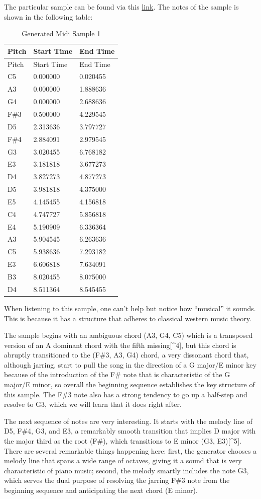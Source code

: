 \documentclass[12pt,oneside]{chicagocapstone}
\begin{document}
The particular sample can be found via this \href{https://github.com/terrywang15/museG_dev/blob/master/2020-01-31\%2002-20/ep_400.mid}{link}. The notes of the sample is shown in the following table:
\begin{longtable}[]{@{}lll@{}}
\caption{\label{tab:inher} Generated Midi Sample 1}\tabularnewline
\toprule
Pitch & Start Time & End Time\tabularnewline
\midrule
\endfirsthead
\toprule
Pitch & Start Time & End Time\tabularnewline
\midrule
\endhead
C5 & 0.000000 & 0.020455\tabularnewline
A3 & 0.000000 & 1.888636\tabularnewline
G4 & 0.000000 & 2.688636\tabularnewline
F\#3 & 0.500000 & 4.229545\tabularnewline
D5 & 2.313636 & 3.797727\tabularnewline
F\#4 & 2.884091 & 2.979545\tabularnewline
G3 & 3.020455 & 6.768182\tabularnewline
E3 & 3.181818 & 3.677273\tabularnewline
D4 & 3.827273 & 4.877273\tabularnewline
D5 & 3.981818 & 4.375000\tabularnewline
E5 & 4.145455 & 4.156818\tabularnewline
C4 & 4.747727 & 5.856818\tabularnewline
E4 & 5.190909 & 6.336364\tabularnewline
A3 & 5.904545 & 6.263636\tabularnewline
C5 & 5.938636 & 7.293182\tabularnewline
E3 & 6.606818 & 7.634091\tabularnewline
B3 & 8.020455 & 8.075000\tabularnewline
D4 & 8.511364 & 8.545455\tabularnewline
\bottomrule
\end{longtable}
When listening to this sample, one can't help but notice how ``musical'' it sounds. This is because it has a structure that adheres to classical western music theory.

The sample begins with an ambiguous chord (A3, G4, C5) which is a transposed version of an A dominant chord with the fifth missing{[}\^{}4{]}, but this chord is abruptly transitioned to the (F\#3, A3, G4) chord, a very dissonant chord that, although jarring, start to pull the song in the direction of a G major/E minor key because of the introduction of the F\# note that is characteristic of the G major/E minor, so overall the beginning sequence establishes the key structure of this sample. The F\#3 note also has a strong tendency to go up a half-step and resolve to G3, which we will learn that it does right after.

The next sequence of notes are very interesting. It starts with the melody line of D5, F\#4, G3, and E3, a remarkably smooth transition that implies D major with the major third as the root (F\#), which transitions to E minor (G3, E3){[}\^{}5{]}. There are several remarkable things happening here: first, the generator chooses a melody line that spans a wide range of octaves, giving it a sound that is very characteristic of piano music; second, the melody smartly includes the note G3, which serves the dual purpose of resolving the jarring F\#3 note from the beginning sequence and anticipating the next chord (E minor).
\end{document}
